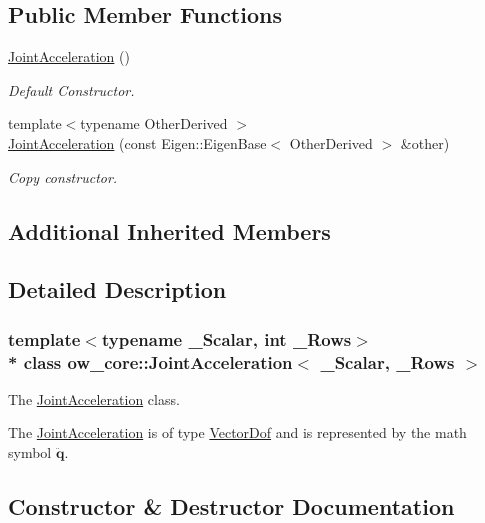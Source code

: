 \subsection*{Public Member Functions}
\begin{DoxyCompactItemize}
\item 
\hyperlink{classow__core_1_1JointAcceleration_aa5de527dfa135e326e6686fa812b5e83}{Joint\+Acceleration} ()\hypertarget{classow__core_1_1JointAcceleration_aa5de527dfa135e326e6686fa812b5e83}{}\label{classow__core_1_1JointAcceleration_aa5de527dfa135e326e6686fa812b5e83}

\begin{DoxyCompactList}\small\item\em Default Constructor. \end{DoxyCompactList}\item 
{\footnotesize template$<$typename Other\+Derived $>$ }\\\hyperlink{classow__core_1_1JointAcceleration_a84e8c4190777f4f93b7a45f5e0195d5d}{Joint\+Acceleration} (const Eigen\+::\+Eigen\+Base$<$ Other\+Derived $>$ \&other)
\begin{DoxyCompactList}\small\item\em Copy constructor. \end{DoxyCompactList}\end{DoxyCompactItemize}
\subsection*{Additional Inherited Members}


\subsection{Detailed Description}
\subsubsection*{template$<$typename \+\_\+\+Scalar, int \+\_\+\+Rows$>$\\*
class ow\+\_\+core\+::\+Joint\+Acceleration$<$ \+\_\+\+Scalar, \+\_\+\+Rows $>$}

The \hyperlink{classow__core_1_1JointAcceleration}{Joint\+Acceleration} class. 

The \hyperlink{classow__core_1_1JointAcceleration}{Joint\+Acceleration} is of type \hyperlink{classow__core_1_1VectorDof}{Vector\+Dof} and is represented by the math symbol $\mathbf{\ddot{q}}$. 

\subsection{Constructor \& Destructor Documentation}
